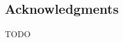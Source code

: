 \newpage
\vspace*{3.5cm}
\begin{center}
\begin{minipage}{12.5cm}
\section*{Acknowledgments}%
TODO
\end{minipage}
\end{center}

